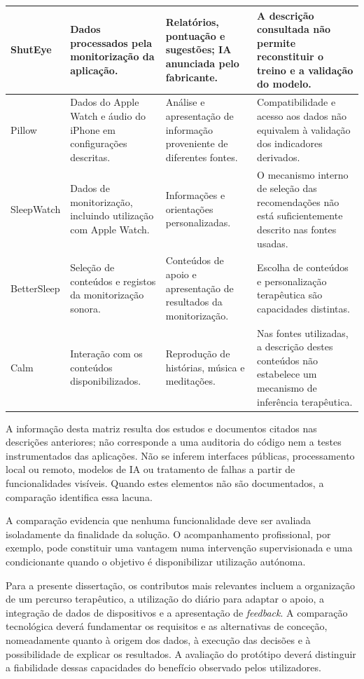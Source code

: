 \begin{xltabular}{\textwidth}{@{}>{\raggedright\arraybackslash}p{2.3cm}>{\raggedright\arraybackslash}X>{\raggedright\arraybackslash}X>{\raggedright\arraybackslash}X@{}}
ShutEye & Dados processados pela monitorização da aplicação. & Relatórios, pontuação e sugestões; IA anunciada pelo fabricante. & A descrição consultada não permite reconstituir o treino e a validação do modelo. \\ \midrule
Pillow & Dados do Apple Watch e áudio do iPhone em configurações descritas. & Análise e apresentação de informação proveniente de diferentes fontes. & Compatibilidade e acesso aos dados não equivalem à validação dos indicadores derivados. \\ \midrule
SleepWatch & Dados de monitorização, incluindo utilização com Apple Watch. & Informações e orientações personalizadas. & O mecanismo interno de seleção das recomendações não está suficientemente descrito nas fontes usadas. \\ \midrule
BetterSleep & Seleção de conteúdos e registos da monitorização sonora. & Conteúdos de apoio e apresentação de resultados da monitorização. & Escolha de conteúdos e personalização terapêutica são capacidades distintas. \\ \midrule
Calm & Interação com os conteúdos disponibilizados. & Reprodução de histórias, música e meditações. & Nas fontes utilizadas, a descrição destes conteúdos não estabelece um mecanismo de inferência terapêutica. \\
\end{xltabular}
\endgroup

A informação desta matriz resulta dos estudos e documentos citados nas descrições anteriores; não corresponde a uma auditoria do código nem a testes instrumentados das aplicações. Não se inferem interfaces públicas, processamento local ou remoto, modelos de IA ou tratamento de falhas a partir de funcionalidades visíveis. Quando estes elementos não são documentados, a comparação identifica essa lacuna.

A comparação evidencia que nenhuma funcionalidade deve ser avaliada isoladamente da finalidade da solução. O acompanhamento profissional, por exemplo, pode constituir uma vantagem numa intervenção supervisionada e uma condicionante quando o objetivo é disponibilizar utilização autónoma.

Para a presente dissertação, os contributos mais relevantes incluem a organização de um percurso terapêutico, a utilização do diário para adaptar o apoio, a integração de dados de dispositivos e a apresentação de \textit{feedback}. A comparação tecnológica deverá fundamentar os requisitos e as alternativas de conceção, nomeadamente quanto à origem dos dados, à execução das decisões e à possibilidade de explicar os resultados. A avaliação do protótipo deverá distinguir a fiabilidade dessas capacidades do benefício observado pelos utilizadores.


